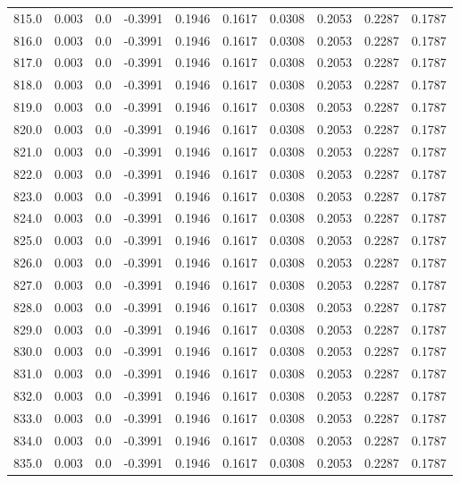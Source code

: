 \begin{longtable}{lrrrrrrrrr}
815.0 & 0.003 & 0.0 & -0.3991 & 0.1946 & 0.1617 & 0.0308 & 0.2053 & 0.2287 & 0.1787 \\
816.0 & 0.003 & 0.0 & -0.3991 & 0.1946 & 0.1617 & 0.0308 & 0.2053 & 0.2287 & 0.1787 \\
817.0 & 0.003 & 0.0 & -0.3991 & 0.1946 & 0.1617 & 0.0308 & 0.2053 & 0.2287 & 0.1787 \\
818.0 & 0.003 & 0.0 & -0.3991 & 0.1946 & 0.1617 & 0.0308 & 0.2053 & 0.2287 & 0.1787 \\
819.0 & 0.003 & 0.0 & -0.3991 & 0.1946 & 0.1617 & 0.0308 & 0.2053 & 0.2287 & 0.1787 \\
820.0 & 0.003 & 0.0 & -0.3991 & 0.1946 & 0.1617 & 0.0308 & 0.2053 & 0.2287 & 0.1787 \\
821.0 & 0.003 & 0.0 & -0.3991 & 0.1946 & 0.1617 & 0.0308 & 0.2053 & 0.2287 & 0.1787 \\
822.0 & 0.003 & 0.0 & -0.3991 & 0.1946 & 0.1617 & 0.0308 & 0.2053 & 0.2287 & 0.1787 \\
823.0 & 0.003 & 0.0 & -0.3991 & 0.1946 & 0.1617 & 0.0308 & 0.2053 & 0.2287 & 0.1787 \\
824.0 & 0.003 & 0.0 & -0.3991 & 0.1946 & 0.1617 & 0.0308 & 0.2053 & 0.2287 & 0.1787 \\
825.0 & 0.003 & 0.0 & -0.3991 & 0.1946 & 0.1617 & 0.0308 & 0.2053 & 0.2287 & 0.1787 \\
826.0 & 0.003 & 0.0 & -0.3991 & 0.1946 & 0.1617 & 0.0308 & 0.2053 & 0.2287 & 0.1787 \\
827.0 & 0.003 & 0.0 & -0.3991 & 0.1946 & 0.1617 & 0.0308 & 0.2053 & 0.2287 & 0.1787 \\
828.0 & 0.003 & 0.0 & -0.3991 & 0.1946 & 0.1617 & 0.0308 & 0.2053 & 0.2287 & 0.1787 \\
829.0 & 0.003 & 0.0 & -0.3991 & 0.1946 & 0.1617 & 0.0308 & 0.2053 & 0.2287 & 0.1787 \\
830.0 & 0.003 & 0.0 & -0.3991 & 0.1946 & 0.1617 & 0.0308 & 0.2053 & 0.2287 & 0.1787 \\
831.0 & 0.003 & 0.0 & -0.3991 & 0.1946 & 0.1617 & 0.0308 & 0.2053 & 0.2287 & 0.1787 \\
832.0 & 0.003 & 0.0 & -0.3991 & 0.1946 & 0.1617 & 0.0308 & 0.2053 & 0.2287 & 0.1787 \\
833.0 & 0.003 & 0.0 & -0.3991 & 0.1946 & 0.1617 & 0.0308 & 0.2053 & 0.2287 & 0.1787 \\
834.0 & 0.003 & 0.0 & -0.3991 & 0.1946 & 0.1617 & 0.0308 & 0.2053 & 0.2287 & 0.1787 \\
835.0 & 0.003 & 0.0 & -0.3991 & 0.1946 & 0.1617 & 0.0308 & 0.2053 & 0.2287 & 0.1787 \\

\end{longtable}
